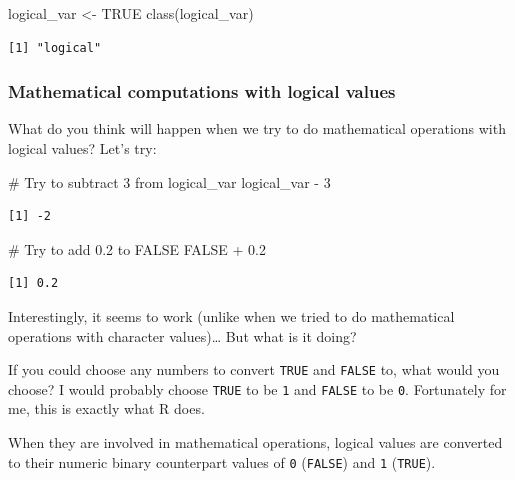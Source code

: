 \documentclass[
  letterpaper,
  DIV=11,
  numbers=noendperiod]{scrreprt}
\newenvironment{Shaded}{\begin{snugshade}}{\end{snugshade}}
\newcommand{\CommentTok}[1]{\textcolor[rgb]{0.37,0.37,0.37}{#1}}
\newcommand{\ConstantTok}[1]{\textcolor[rgb]{0.56,0.35,0.01}{#1}}
\newcommand{\DecValTok}[1]{\textcolor[rgb]{0.68,0.00,0.00}{#1}}
\newcommand{\FloatTok}[1]{\textcolor[rgb]{0.68,0.00,0.00}{#1}}
\newcommand{\FunctionTok}[1]{\textcolor[rgb]{0.28,0.35,0.67}{#1}}
\newcommand{\NormalTok}[1]{\textcolor[rgb]{0.00,0.23,0.31}{#1}}
\newcommand{\OtherTok}[1]{\textcolor[rgb]{0.00,0.23,0.31}{#1}}
\newcommand{\SpecialCharTok}[1]{\textcolor[rgb]{0.37,0.37,0.37}{#1}}
\begin{document}
\begin{Shaded}
\begin{Highlighting}[]
\NormalTok{logical\_var }\OtherTok{\textless{}{-}} \ConstantTok{TRUE}
\FunctionTok{class}\NormalTok{(logical\_var)}
\end{Highlighting}
\end{Shaded}

\begin{verbatim}
[1] "logical"
\end{verbatim}

\subsubsection{Mathematical computations with logical
values}\label{mathematical-computations-with-logical-values}

What do you think will happen when we try to do mathematical operations
with logical values? Let's try:

\begin{Shaded}
\begin{Highlighting}[]
\CommentTok{\# Try to subtract 3 from logical\_var}
\NormalTok{logical\_var }\SpecialCharTok{{-}} \DecValTok{3}
\end{Highlighting}
\end{Shaded}

\begin{verbatim}
[1] -2
\end{verbatim}

\begin{Shaded}
\begin{Highlighting}[]
\CommentTok{\# Try to add 0.2 to FALSE}
\ConstantTok{FALSE} \SpecialCharTok{+} \FloatTok{0.2}
\end{Highlighting}
\end{Shaded}

\begin{verbatim}
[1] 0.2
\end{verbatim}

Interestingly, it seems to work (unlike when we tried to do mathematical
operations with character values)\ldots{} But what is it doing?

If you could choose any numbers to convert \texttt{TRUE} and
\texttt{FALSE} to, what would you choose? I would probably choose
\texttt{TRUE} to be \texttt{1} and \texttt{FALSE} to be \texttt{0}.
Fortunately for me, this is exactly what R does.

When they are involved in mathematical operations, logical values are
converted to their numeric binary counterpart values of \texttt{0}
(\texttt{FALSE}) and \texttt{1} (\texttt{TRUE}).
\end{document}
